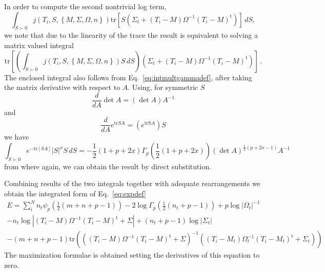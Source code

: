 \documentclass[english,listof=totoc]{scrartcl}
\begin{document}
In order to compute the second nontrivial log term,
\begin{equation}
\int_{S\succ 0}j\left(T_{i},S,\left\{M,\Sigma,\Omega,n\right\}\right)\textrm{tr}\left[S(\Sigma_{t}+(T_{i}-M)\Omega^{-1}(T_{i}-M)^{\textrm{t}})\right]\,dS,
\end{equation}
we note that due to the linearity of the trace the result is equivalent to solving a matrix valued integral
\begin{equation}
\textrm{tr}\left[\left(\int_{S\succ 0}j\left(T_{i},S,\left\{M,\Sigma,\Omega,n\right\}\right)S\,dS\right)(\Sigma_{t}+(T_{i}-M)\Omega^{-1}(T_{i}-M)^{\textrm{t}})\right]\,.
\end{equation}
The enclosed integral also follows from Eq.~\eqref{eq:intmultgammadef}, after taking the matrix derivative with respect to $A$. Using, for symmetric $S$
\begin{equation}
\frac{d}{dA}\det A=(\det A)A^{-1}\label{eq:detderivative}
\end{equation}
and
\begin{equation}
\frac{d}{dA}e^{\textrm{tr}SA}=(e^{\textrm{trS}A})S
\end{equation}
we have 
\begin{equation}
\int_{S\succ 0}e^{-\textrm{tr}\left[SA\right]}|S|^{x}S\,dS=-\frac{1}{2}(1+p+2x)\Gamma_{p}\left(\frac{1}{2}(1+p+2x)\right)(\det A)^{\frac{1}{2}(p+2x-1)}A^{-1}
\end{equation}
from where again, we can obtain the result by direct substitution.

Combining results of the two integrals together with adequate rearrangements we obtain the integrated form of Eq.~\eqref{eq:expdef}
\begin{equation}
\begin{split}E=\sum_{i}^{N}n_{t}\psi_{p}\left(\frac{1}{2}(m+n+p-1)\right)-2\log\Gamma_{p}\left(\frac{1}{2}(n_{t}+p-1)\right)+p\log|\Omega_{t}|^{-1}\\
-n_{t}\log|(T_{i}-M)\Omega^{-1}(T_{i}-M)^{\textrm{t}}+\Sigma|+(n_{t}+p-1)\log |\Sigma_{t}|\\
-(m+n+p-1)\textrm{tr}\left(\left((T_{i}-M)\Omega^{-1}(T_{i}-M)^{\textrm{t}}+\Sigma\right)^{-1}\left((T_{i}-M_{t})\Omega_{t}^{-1}(T_{i}-M_{t})^{\textrm{t}}+\Sigma_{t}\right)\right)
\end{split}
\label{eq:fsimp}
\end{equation}
The maximization formulae is obtained setting the derivatives of this equation to zero.
\end{document}
